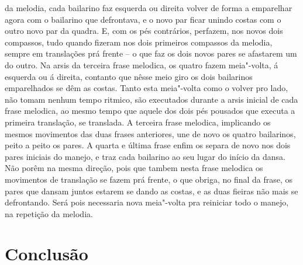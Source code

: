 da melodia, cada bailarino faz esquerda ou direita volver de forma a
emparelhar agora com o bailarino que defrontava, e o novo par ficar
unindo costas com o outro novo par da quadra. E, com os pés contrários,
perfazem, nos novos dois compassos, tudo quando fizeram nos dois
primeiros compassos da melodia, sempre em translações prá frente -- o
que faz os dois novos pares se afastarem um do outro. Na arsis da
terceira frase melodica, os quatro fazem meia"-volta, á esquerda ou á
direita, contanto que nêsse meio giro os dois bailarinos emparelhados se
dêm as costas. Tanto esta meia"-volta como o volver pro lado, não tomam
nenhum tempo ritmico, são executados durante a arsis inicial de cada
frase melodica, ao mesmo tempo que aquele dos dois pés pousados que
executa a primeira translação, se translada. A terceira frase melodica,
implicando os mesmos movimentos das duas frases anteriores, une de novo
os quatro bailarinos, peito a peito os pares. A quarta e última frase
enfim os separa de novo nos dois pares iniciais do manejo, e traz cada
bailarino ao seu lugar do início da dansa. Não porêm na mesma direção,
pois que tambem nesta frase melodica os movimentos de translação se
fazem prá frente, o que obriga, no final da frase, os pares que dansam
juntos estarem se dando as costas, e as duas fieiras não mais se
defrontando. Será pois necessaria nova meia"-volta pra reiniciar todo o
manejo, na repetição da melodia.

\pagebreak

\section{Conclusão}

